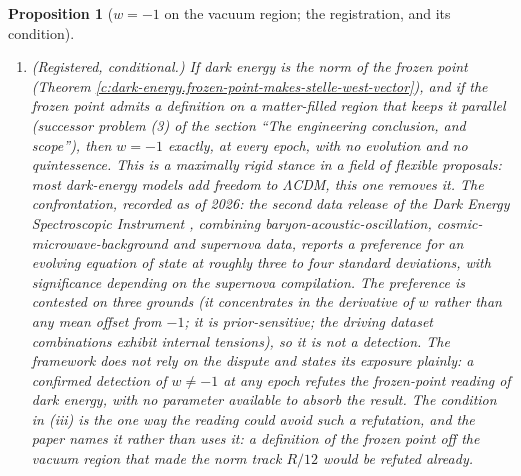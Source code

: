 \documentclass[11pt]{article}
\newtheorem{proposition}[theorem]{Proposition}
\theoremstyle{definition}
\theoremstyle{plain}
\begin{document}
\begin{proposition}[$w = -1$ on the vacuum region; the registration, and its condition]
\begin{enumerate}
\item[(iii)] \emph{(Registered, conditional.)} If dark energy is the norm of the frozen point (Theorem \ref{c:dark-energy.frozen-point-makes-stelle-west-vector}), and if the frozen point admits a definition on a matter-filled region that keeps it parallel (successor problem (3) of the section ``The engineering conclusion, and scope''), then $w = -1$ exactly, at every epoch, with no evolution and no quintessence. This is a maximally rigid stance in a field of flexible proposals: most dark-energy models add freedom to $\Lambda$CDM, this one removes it. \emph{The confrontation, recorded as of 2026:} the second data release of the Dark Energy Spectroscopic Instrument \cite{DESI2025}, combining baryon-acoustic-oscillation, cosmic-microwave-background and supernova data, reports a preference for an evolving equation of state at roughly three to four standard deviations, with significance depending on the supernova compilation. The preference is contested on three grounds (it concentrates in the derivative of $w$ rather than any mean offset from $-1$; it is prior-sensitive; the driving dataset combinations exhibit internal tensions), so it is not a detection. The framework does not rely on the dispute and states its exposure plainly: a confirmed detection of $w \neq -1$ at any epoch refutes the frozen-point reading of dark energy, with no parameter available to absorb the result. The condition in (iii) is the one way the reading could avoid such a refutation, and the paper names it rather than uses it: a definition of the frozen point off the vacuum region that made the norm track $R/12$ would be refuted already.
\end{enumerate}
\end{proposition}
\end{document}
